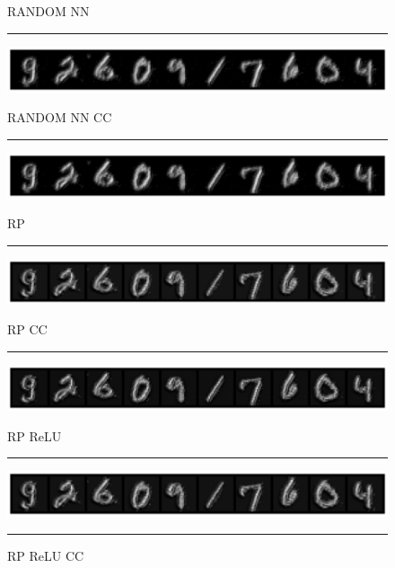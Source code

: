 \begin{figure}
    \centering
    \setlength{\abovecaptionskip}{0pt plus 0pt minus 0pt}
    \setlength{\belowcaptionskip}{16pt plus 0pt minus 0pt}
    \caption*{\normalsize{RANDOM NN}}
    \rule{0.4\textwidth}{.4pt}
    
    \centerline{\hspace*{8mm}\includegraphics[width=1.4\textwidth]{figures/reconstruction_MNIST_RANDOM_NN_epoch_100.png}}
    \caption*{\normalsize{RANDOM NN CC}}
    \rule{0.4\textwidth}{.4pt}
    
    \centerline{\hspace*{8mm}\includegraphics[width=1.4\textwidth]{figures/reconstruction_MNIST_RANDOM_NN_CC_epoch_100.png}}
    \caption*{\normalsize{RP}}
    \rule{0.4\textwidth}{.4pt}
    
    \centerline{\hspace*{8mm}\includegraphics[width=1.4\textwidth]{figures/reconstruction_MNIST_RP_epoch_100.png}}
    \caption*{\normalsize{RP CC}}
    \rule{0.4\textwidth}{.4pt}
    
    \centerline{\hspace*{8mm}\includegraphics[width=1.4\textwidth]{figures/reconstruction_MNIST_RP_CC_epoch_100.png}}
    \caption*{\normalsize{RP ReLU}}
    \rule{0.4\textwidth}{.4pt}
    
    \centerline{\hspace*{8mm}\includegraphics[width=1.4\textwidth]{figures/reconstruction_MNIST_RP_ReLU_epoch_100.png}}
    \caption*{\normalsize{RP ReLU CC}}
    \rule{0.4\textwidth}{.4pt}
    

\end{figure}
